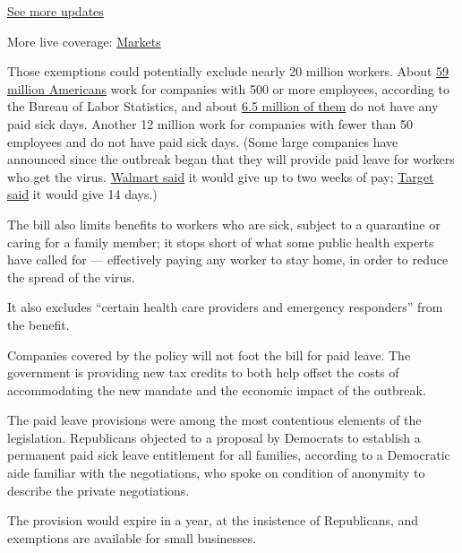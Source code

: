 \href{https://www.nytimes3xbfgragh.onion/2020/09/08/world/covid-19-coronavirus.html?action=click\&pgtype=Article\&state=default\&region=MAIN_CONTENT_1\&context=storylines_live_updates}{See
more updates}

More live coverage:
\href{https://www.nytimes3xbfgragh.onion/live/2020/09/08/business/stock-market-today-coronavirus?action=click\&pgtype=Article\&state=default\&region=MAIN_CONTENT_1\&context=storylines_live_updates}{Markets}

Those exemptions could potentially exclude nearly 20 million workers.
About \href{https://www.bls.gov/web/cewbd/table_f.txt}{59 million
Americans} work for companies with 500 or more employees, according to
the Bureau of Labor Statistics, and about
\href{https://www.bls.gov/ncs/ebs/benefits/2019/ownership/private/table31a.pdf}{6.5
million of them} do not have any paid sick days. Another 12 million work
for companies with fewer than 50 employees and do not have paid sick
days. (Some large companies have announced since the outbreak began that
they will provide paid leave for workers who get the virus.
\href{https://corporate.walmart.com/newsroom/2020/03/10/new-covid-19-policy-to-support-the-health-of-our-associates}{Walmart
said} it would give up to two weeks of pay;
\href{https://corporate.target.com/about/purpose-history/our-commitments/target-coronavirus-hub}{Target
said} it would give 14 days.)

The bill also limits benefits to workers who are sick, subject to a
quarantine or caring for a family member; it stops short of what some
public health experts have called for --- effectively paying any worker
to stay home, in order to reduce the spread of the virus.

It also excludes ``certain health care providers and emergency
responders'' from the benefit.

Companies covered by the policy will not foot the bill for paid leave.
The government is providing new tax credits to both help offset the
costs of accommodating the new mandate and the economic impact of the
outbreak.

The paid leave provisions were among the most contentious elements of
the legislation. Republicans objected to a proposal by Democrats to
establish a permanent paid sick leave entitlement for all families,
according to a Democratic aide familiar with the negotiations, who spoke
on condition of anonymity to describe the private negotiations.

The provision would expire in a year, at the insistence of Republicans,
and exemptions are available for small businesses.

